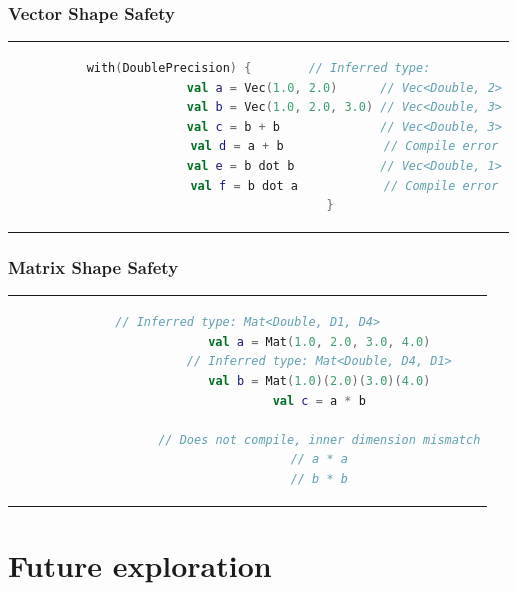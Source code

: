\documentclass{beamer}
\begin{document}
    \begin{frame}[fragile]
        \frametitle{Vector Shape Safety}
        \begin{center}
            \begin{tabular}{c}
                \begin{lstlisting}[language=Kotlin, gobble=20]
                    with(DoublePrecision) {        // Inferred type:
                        val a = Vec(1.0, 2.0)      // Vec<Double, 2>
                        val b = Vec(1.0, 2.0, 3.0) // Vec<Double, 3>
                        val c = b + b              // Vec<Double, 3>
                        val d = a + b              // Compile error
                        val e = b dot b            // Vec<Double, 1>
                        val f = b dot a            // Compile error
                    }
                \end{lstlisting}
            \end{tabular}
        \end{center}
    \end{frame}

    \begin{frame}[fragile]
        \frametitle{Matrix Shape Safety}
        \begin{center}
            \begin{tabular}{c}
                \begin{lstlisting}[language=Kotlin, gobble=20, style=backtickstyle]
                    // Inferred type: Mat<Double, D1, D4>
                    val a = Mat(1.0, 2.0, 3.0, 4.0)
                    // Inferred type: Mat<Double, D4, D1>
                    val b = Mat(1.0)(2.0)(3.0)(4.0)
                    val c = a * b

                    // Does not compile, inner dimension mismatch
                    // a * a
                    // b * b
                \end{lstlisting}
            \end{tabular}
        \end{center}
    \end{frame}

    \section{Future exploration}
\end{document}
